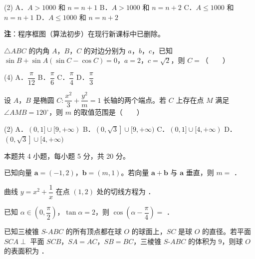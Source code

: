 \begin{center}\end{center}

\begin{gkopts}(2)
\task A．$A>1000$ 和 $n=n+1$
\task B．$A>1000$ 和 $n=n+2$
\task C．$A\le1000$ 和 $n=n+1$
\task D．$A\le1000$ 和 $n=n+2$
\end{gkopts}

\begin{gktip}
\textbf{注}：程序框图（算法初步）在现行新课标中已删除。
\end{gktip}

$\triangle ABC$ 的内角 $A$，$B$，$C$ 的对边分别为 $a$，$b$，$c$，已知 $\sin B+\sin A(\sin C-\cos C)=0$，$a=2$，$c=\sqrt2$，则 $C=$（　　）

\begin{gkopts}(4)
\task A．$\dfrac\pi{12}$
\task B．$\dfrac\pi6$
\task C．$\dfrac\pi4$
\task D．$\dfrac\pi3$
\end{gkopts}

设 $A$，$B$ 是椭圆 $C:\dfrac{x^{2}}3+\dfrac{y^{2}}m=1$ 长轴的两个端点。若 $C$ 上存在点 $M$ 满足 $\angle AMB=120^\circ$，则 $m$ 的取值范围是（　　）

\begin{gkopts}(2)
\task A．$(0,1]\cup[9,+\infty)$
\task B．$\left(0,\sqrt3\right]\cup[9,+\infty)$
\task C．$(0,1]\cup[4,+\infty)$
\task D．$\left(0,\sqrt3\right]\cup[4,+\infty)$
\end{gkopts}

\par\medskip


\begin{gktip}
本题共 4 小题，每小题 5 分，共 20 分。
\end{gktip}

已知向量 $\boldsymbol a=(-1,2)$，$\boldsymbol b=(m,1)$。若向量 $\boldsymbol a+\boldsymbol b$ 与 $\boldsymbol a$ 垂直，则 $m=$ \gkblank{}．

曲线 $y=x^{2}+\dfrac1x$ 在点 $(1,2)$ 处的切线方程为 \gkblank{}．

已知 $\alpha\in\left(0,\dfrac\pi2\right)$，$\tan\alpha=2$，则 $\cos\left(\alpha-\dfrac\pi4\right)=$ \gkblank{}．

已知三棱锥 $S\text{-}ABC$ 的所有顶点都在球 $O$ 的球面上，$SC$ 是球 $O$ 的直径。若平面 $SCA\perp$ 平面 $SCB$，$SA=AC$，$SB=BC$，三棱锥 $S\text{-}ABC$ 的体积为 $9$，则球 $O$ 的表面积为 \gkblank{}．


